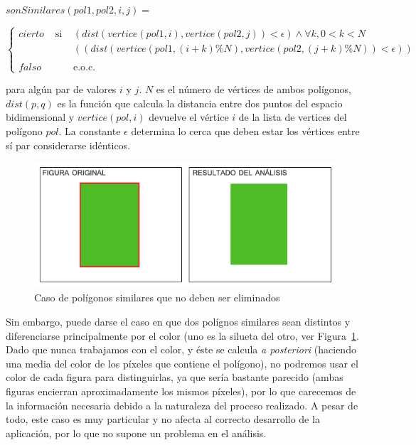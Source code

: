 {	\begin{center}
		$sonSimilares(pol1,pol2,i,j) =$
	\end{center}
	\begin{center}
		
		$\left\{
		\begin{array}{ccc}
		cierto 	& \text{ si } & (dist(vertice(pol1,i), vertice(pol2,j)) < \epsilon)\wedge \forall k, 0 < k < N \\
				&             &  ((dist(vertice(pol1,(i + k) \%N), vertice(pol2,(j + k)\%N)) < \epsilon))\\
		 & & \\
		falso 	& 	          & \text{e.o.c.}
		\end{array}\right.$
		\end{center}
	
	para algún par de valores $i$ y $j$. $N$ es el número de vértices de ambos polígonos, $dist(p,q)$ es la función que calcula la distancia entre dos puntos del espacio bidimensional y $vertice(pol, i)$ devuelve el vértice $i$ de la lista de vertices del polígono $pol$. La constante $\epsilon$ determina lo cerca que deben estar los vértices entre sí par considerarse idénticos.\\
	
		\begin{figure}[!htbp]
		\centering
		\includegraphics[scale=0.47]{graphics/reppoly.png}
		\caption{Caso de polígonos similares que no deben ser eliminados}
		\label{fig:colorsimilares}
		\end{figure}
	
	Sin embargo, puede darse el caso en que dos polígnos similares sean distintos y diferenciarse principalmente por el color (uno es la silueta del otro, ver Figura~\ref{fig:colorsimilares}. Dado que nunca trabajamos con el color, y éste se calcula \emph{a posteriori} (haciendo una media del color de los píxeles que contiene el polígono), no podremos usar el color de cada figura para distinguirlas, ya que sería bastante parecido (ambas figuras encierran aproximadamente los mismos píxeles), por lo que carecemos de la información necesaria debido a la naturaleza del proceso realizado. A pesar de todo, este caso es muy particular y no afecta al correcto desarrollo de la aplicación, por lo que no supone un problema en el análisis.\\
	
}
